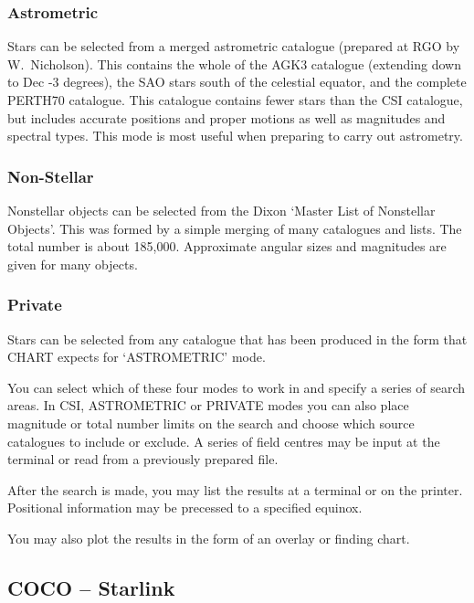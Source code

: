 \documentclass[twoside,11pt]{article}
\newcommand{\htmladdnormallink}[2]{#1}
\newcommand{\xref}[3]{#1}
\newcommand{\xlabel}[1]{}
\newcommand{\COCOref}{\xref{COCO}{sun56}{}}
\newcommand{\RGOref}{\htmladdnormallink{RGO}{http://www.ast.cam.ac.uk/RGO/RGO.html}}
\newcommand{\STARLINKref}{\htmladdnormallink{Starlink}{http://star-www.rl.ac.uk/}}
\newcommand{\CHARTref}{\xref{CHART}{sun32}{}}
\begin{document}
\subsubsection{Astrometric}

Stars can be selected from a merged astrometric catalogue (prepared at {\RGOref} by
W.~Nicholson). This contains the whole of the AGK3 catalogue (extending down
to Dec -3 degrees), the SAO stars south of the celestial equator, and the complete
PERTH70 catalogue. This catalogue contains fewer stars than the CSI
catalogue, but includes accurate positions and proper motions as well as
magnitudes and spectral types. This mode is most useful when preparing to
carry out astrometry. 

\subsubsection{Non-Stellar}

Nonstellar objects can be selected from the Dixon `Master List of Nonstellar
Objects'. This was formed by a simple merging of many catalogues and lists. 
The total number is about 185,000. Approximate angular sizes and magnitudes
are given for many objects. 

\subsubsection{Private}

Stars can be selected from any catalogue that has been produced in the form
that {\CHARTref} expects for `ASTROMETRIC' mode. 

You can select which of these four modes to work in and specify a series of
search areas. In CSI, ASTROMETRIC or PRIVATE modes you can also place
magnitude or total number limits on the search and choose which source
catalogues to include or exclude. A series of field centres may be input at
the terminal or read from a previously prepared file. 
 
After the search is made, you may list the results at a terminal or on the
printer. Positional information may be precessed to a specified equinox. 
 
You may also plot the results in the form of an overlay or finding chart.


\subsection{{\COCOref} -- {\STARLINKref}} \xlabel{COCO}
\label{sec:coco}
 
\end{document}
